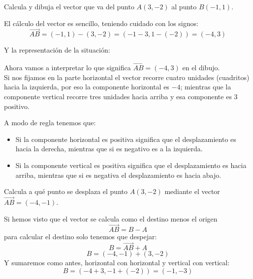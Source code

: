 \documentclass[a4paper,11pt,answers]{exam}
\begin{document}
\begin{questions}
\question Calcula y dibuja el vector que va del punto $A(3,-2)$ al punto $B(-1, 1)$.
  \begin{solution}
    El cálculo del vector es sencillo, teniendo cuidado con los signos:
    \[\overrightarrow{AB} = (-1, 1) - (3, -2) = (-1-3, 1-(-2)) = (-4, 3)\]
    
    Y la representación de la situación:
    \begin{center}
    \end{center}
  \end{solution}
Ahora vamos a interpretar lo que significa $\overrightarrow{AB} = (-4,3)$ en el dibujo.\\
Si nos fijamos en la parte horizontal el vector recorre cuatro unidades (cuadritos)
hacia la izquierda,
por eso la componente horizontal es $-4$; mientras que la componente vertical recorre tres
unidades hacia arriba y esa componente es $3$ positivo.

A modo de regla tenemos que:
\begin{itemize}
\item Si la componente horizontal es positiva significa que el desplazamiento es hacia la
  derecha, mientras que si es negativo es a la izquierda.
\item Si la componente vertical es positiva significa que el desplazamiento es hacia arriba,
  mientras que si es negativa el desplazamiento es hacia abajo.
\end{itemize}

\question Calcula a qué punto se desplaza el punto $A(3,-2)$ mediante el vector
  $\overrightarrow{AB} = (-4, -1)$.
  \begin{solution}
    Si hemos visto que el vector se calcula como el destino menos el origen
    \[\overrightarrow{AB} = B-A\]
    para calcular el destino solo tenemos que despejar:
    \[B = \overrightarrow{AB} + A\]
    \[B = (-4, -1) + (3, -2)\]
    Y sumaremos como antes, horizontal con horizontal y vertical con vertical:
    \[B = (-4+ 3, -1 + (-2)) = (-1, -3)\]


\end{solution}
\end{questions}
\end{document}

